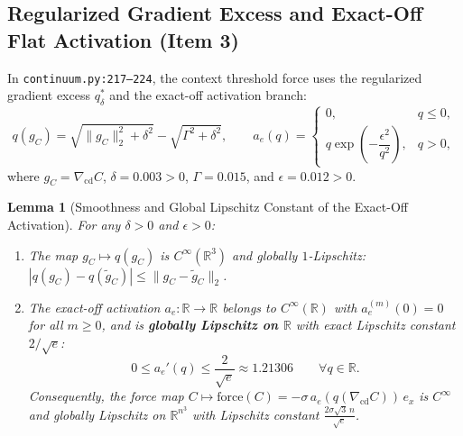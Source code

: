 \documentclass[11pt,a4paper]{article}
\newtheorem{lemma}[theorem]{Lemma}
\theoremstyle{definition}
\begin{document}
\subsection{Regularized Gradient Excess and Exact-Off Flat Activation (Item 3)}

In \texttt{continuum.py:217--224}, the context threshold force uses the regularized gradient excess $q_{\delta}^*$ and the exact-off activation branch:
\begin{equation}
  q(g_C) = \sqrt{\|g_C\|_2^2 + \delta^2} - \sqrt{\Gamma^2 + \delta^2}, \qquad
  a_e(q) = \begin{cases}
    0, & q \le 0, \\
    q \exp\!\left(-\dfrac{\epsilon^2}{q^2}\right), & q > 0,
  \end{cases}
\end{equation}
where $g_C = \nabla_{\mathrm{cd}} C$, $\delta = 0.003 > 0$, $\Gamma = 0.015$, and $\epsilon = 0.012 > 0$.

\begin{lemma}[Smoothness and Global Lipschitz Constant of the Exact-Off Activation]
\label{lem:activation}
For any $\delta > 0$ and $\epsilon > 0$:
\begin{enumerate}
  \item The map $g_C \mapsto q(g_C)$ is $C^\infty(\mathbb{R}^3)$ and globally $1$-Lipschitz: $|q(g_C) - q(\widetilde{g}_C)| \le \|g_C - \widetilde{g}_C\|_2$.
  \item The exact-off activation $a_e : \mathbb{R} \to \mathbb{R}$ belongs to $C^\infty(\mathbb{R})$ with $a_e^{(m)}(0) = 0$ for all $m \ge 0$, and is \textbf{globally Lipschitz on $\mathbb{R}$} with exact Lipschitz constant $2/\sqrt{e}$:
  \begin{equation}
    0 \le a_e'(q) \le \frac{2}{\sqrt{e}} \approx 1.21306 \qquad \forall q \in \mathbb{R}.
  \end{equation}
  Consequently, the force map $C \mapsto \mathrm{force}(C) = -\sigma\, a_e(q(\nabla_{\mathrm{cd}} C))\, e_x$ is $C^\infty$ and globally Lipschitz on $\mathbb{R}^{n^3}$ with Lipschitz constant $\frac{2\sigma\sqrt{3}\,n}{\sqrt{e}}$.
\end{enumerate}
\end{lemma}
\end{document}
